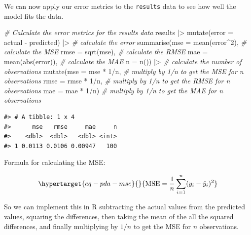 \documentclass[
  letterpaper,
]{scrbook}
\newenvironment{Shaded}{\begin{snugshade}}{\end{snugshade}}
\newcommand{\AttributeTok}[1]{\textcolor[rgb]{0.00,0.00,0.00}{#1}}
\newcommand{\CommentTok}[1]{\textcolor[rgb]{0.00,0.00,0.00}{\textit{#1}}}
\newcommand{\DecValTok}[1]{\textcolor[rgb]{0.00,0.00,0.00}{#1}}
\newcommand{\FunctionTok}[1]{\textcolor[rgb]{0.00,0.00,0.00}{#1}}
\newcommand{\NormalTok}[1]{\textcolor[rgb]{0.00,0.00,0.00}{#1}}
\newcommand{\SpecialCharTok}[1]{\textcolor[rgb]{0.00,0.00,0.00}{#1}}
\begin{document}
We can now apply our error metrics to the \texttt{results} data to see
how well the model fits the data.

\begin{Shaded}
\begin{Highlighting}[]
\CommentTok{\# Calculate the error metrics for the \textasciigrave{}results\textasciigrave{} data}
\NormalTok{results }\SpecialCharTok{|\textgreater{}} 
    \FunctionTok{mutate}\NormalTok{(}\AttributeTok{error =}\NormalTok{ actual }\SpecialCharTok{{-}}\NormalTok{ predicted) }\SpecialCharTok{|\textgreater{}} \CommentTok{\# calculate the error}
    \FunctionTok{summarise}\NormalTok{(}\AttributeTok{mse =} \FunctionTok{mean}\NormalTok{(error}\SpecialCharTok{\^{}}\DecValTok{2}\NormalTok{),  }\CommentTok{\# calculate the MSE}
              \AttributeTok{rmse =} \FunctionTok{sqrt}\NormalTok{(mse),  }\CommentTok{\# calculate the RMSE}
              \AttributeTok{mae =} \FunctionTok{mean}\NormalTok{(}\FunctionTok{abs}\NormalTok{(error)),  }\CommentTok{\# calculate the MAE}
              \AttributeTok{n =} \FunctionTok{n}\NormalTok{()) }\SpecialCharTok{|\textgreater{}}  \CommentTok{\# calculate the number of observations}
    \FunctionTok{mutate}\NormalTok{(}\AttributeTok{mse =}\NormalTok{ mse }\SpecialCharTok{*} \DecValTok{1}\SpecialCharTok{/}\NormalTok{n,  }\CommentTok{\# multiply by 1/n to get the MSE for n observations}
           \AttributeTok{rmse =}\NormalTok{ rmse }\SpecialCharTok{*} \DecValTok{1}\SpecialCharTok{/}\NormalTok{n,  }\CommentTok{\# multiply by 1/n to get the RMSE for n observations}
           \AttributeTok{mae =}\NormalTok{ mae }\SpecialCharTok{*} \DecValTok{1}\SpecialCharTok{/}\NormalTok{n)  }\CommentTok{\# multiply by 1/n to get the MAE for n observations}
\end{Highlighting}
\end{Shaded}

\begin{verbatim}
#> # A tibble: 1 x 4
#>      mse   rmse     mae     n
#>    <dbl>  <dbl>   <dbl> <int>
#> 1 0.0113 0.0106 0.00947   100
\end{verbatim}

Formula for calculating the MSE:

\begin{equation}\protect\hypertarget{eq-pda-mse}{}{
\text{MSE} = \frac{1}{n} \sum_{i=1}^{n} (y_i - \hat{y}_i)^2
}\label{eq-pda-mse}\end{equation}

So we can implement this in R subtracting the actual values from the
predicted values, squaring the differences, then taking the mean of the
all the squared differences, and finally multiplying by \(1/n\) to get
the MSE for \(n\) observations.
\end{document}
